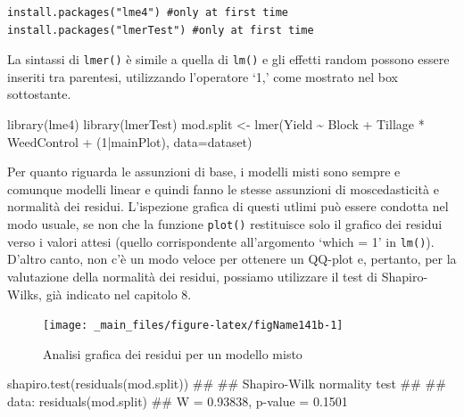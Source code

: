 \documentclass[a4paper,12pt,oneside]{book}
\newenvironment{Shaded}{\begin{snugshade}}{\end{snugshade}}
\newcommand{\DecValTok}[1]{#1}
\newcommand{\SpecialCharTok}[1]{#1}
\newcommand{\DocumentationTok}[1]{#1}
\newcommand{\OtherTok}[1]{#1}
\newcommand{\FunctionTok}[1]{#1}
\newcommand{\AttributeTok}[1]{#1}
\newcommand{\NormalTok}[1]{#1}
\begin{document}
\begin{verbatim}
install.packages("lme4") #only at first time
install.packages("lmerTest") #only at first time
\end{verbatim}

La sintassi di \texttt{lmer()} è simile a quella di \texttt{lm()} e gli effetti random possono essere inseriti tra parentesi, utilizzando l'operatore `1\textbar{},' come mostrato nel box sottostante.

\begin{Shaded}
\begin{Highlighting}[]
\FunctionTok{library}\NormalTok{(lme4)}
\FunctionTok{library}\NormalTok{(lmerTest)}
\NormalTok{mod.split }\OtherTok{\textless{}{-}} \FunctionTok{lmer}\NormalTok{(Yield }\SpecialCharTok{\textasciitilde{}}\NormalTok{ Block }\SpecialCharTok{+}\NormalTok{ Tillage }\SpecialCharTok{*}\NormalTok{ WeedControl }\SpecialCharTok{+}
\NormalTok{                  (}\DecValTok{1}\SpecialCharTok{|}\NormalTok{mainPlot), }\AttributeTok{data=}\NormalTok{dataset)}
\end{Highlighting}
\end{Shaded}

Per quanto riguarda le assunzioni di base, i modelli misti sono sempre e comunque modelli linear e quindi fanno le stesse assunzioni di moscedasticità e normalità dei residui. L'ispezione grafica di questi utlimi può essere condotta nel modo usuale, se non che la funzione \texttt{plot()} restituisce solo il grafico dei residui verso i valori attesi (quello corrispondente all'argomento `which = 1' in \texttt{lm()}). D'altro canto, non c'è un modo veloce per ottenere un QQ-plot e, pertanto, per la valutazione della normalità dei residui, possiamo utilizzare il test di Shapiro-Wilks, già indicato nel capitolo 8.

\begin{figure}

{\centering \texttt{[image: \_main\_files/figure-latex/figName141b-1]} 

}

\caption{Analisi grafica dei residui per un modello misto}\label{fig:figName141b}
\end{figure}

\begin{Shaded}
\begin{Highlighting}[]
\FunctionTok{shapiro.test}\NormalTok{(}\FunctionTok{residuals}\NormalTok{(mod.split))}
\DocumentationTok{\#\# }
\DocumentationTok{\#\#  Shapiro{-}Wilk normality test}
\DocumentationTok{\#\# }
\DocumentationTok{\#\# data:  residuals(mod.split)}
\DocumentationTok{\#\# W = 0.93838, p{-}value = 0.1501}
\end{Highlighting}
\end{Shaded}
\end{document}
